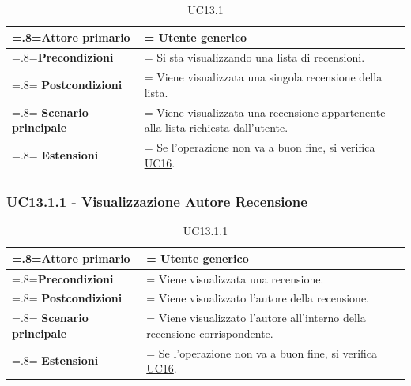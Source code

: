             \begin{table}[H]
                \centering
                \renewcommand{\arraystretch}{1.8}
                \renewcommand\tabularxcolumn[1]{m{#1}}
                \begin{tabularx}{0.9\textwidth} {
                    >{\hsize=.8\hsize\linewidth=\hsize}X
                    >{\hsize=1.2\hsize\linewidth=\hsize}X}
                    \hline
                    \textbf{Attore primario} & Utente generico \\
                    \hline
                    \textbf{Precondizioni} & Si sta visualizzando una lista di recensioni. \\
                    \hline
                    \textbf{Postcondizioni} & Viene visualizzata una singola recensione della lista. \\
                    \hline
                    \textbf{Scenario principale} & Viene visualizzata una recensione appartenente alla lista richiesta dall'utente. \\
                    \hline
                    \textbf{Estensioni} & Se l'operazione non va a buon fine, si verifica \hyperref[UC16]{UC16}. \\
                    \hline
                \end{tabularx}
                \caption{UC13.1}
            \end{table}

        \subsubsection{UC13.1.1 - Visualizzazione Autore Recensione}
        \label{UC13.1.1}

            \begin{table}[H]
                \centering
                \renewcommand{\arraystretch}{1.8}
                \renewcommand\tabularxcolumn[1]{m{#1}}
                \begin{tabularx}{0.9\textwidth} {
                    >{\hsize=.8\hsize\linewidth=\hsize}X
                    >{\hsize=1.2\hsize\linewidth=\hsize}X}
                    \hline
                    \textbf{Attore primario} & Utente generico \\
                    \hline
                    \textbf{Precondizioni} & Viene visualizzata una recensione. \\
                    \hline
                    \textbf{Postcondizioni} & Viene visualizzato l'autore della recensione. \\
                    \hline
                    \textbf{Scenario principale} & Viene visualizzato l'autore all'interno della recensione corrispondente. \\
                    \hline
                    \textbf{Estensioni} & Se l'operazione non va a buon fine, si verifica \hyperref[UC16]{UC16}. \\
                    \hline
                \end{tabularx}
                \caption{UC13.1.1}
            \end{table}

